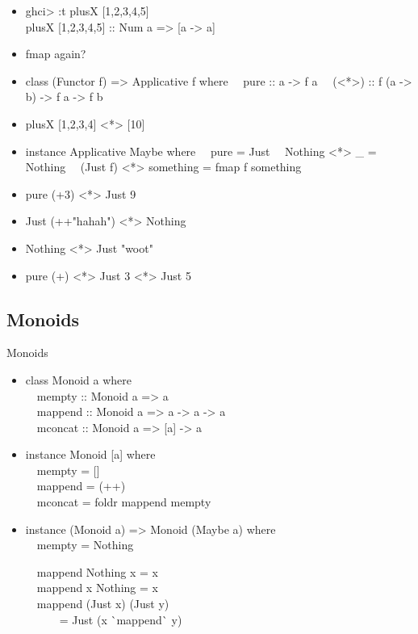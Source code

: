 \documentclass{beamer}                  %
\newcommand{\srule}{
	\rule{\textwidth}{1pt}\\
}
\newlength{\subsecwidth}
\newenvironment{slide}{
	\begin{frame} %
	\settowidth{\subsecwidth}{\insertsubsection} %
	\ifthenelse{\dimtest{\subsecwidth}{<}{1pt}}{ %
		\frametitle{\insertsection\\             %
		\vspace{-1ex}                            %
		\color{fore}\srule                       %
		\par                                     %
		\vspace{-3ex}                            %
		}
	}{                                           %
		\frametitle{\insertsection\ -- \insertsubsection\\ %
		\vspace{-1ex}                            %
		\color{fore}\srule                       %
		\par                                     %
		\vspace{-3ex}                            %
		}
	}
	\Large                                       %
}{
	\end{frame}
}
\begin{document}
\begin{slide}
  \begin{itemize}
    \item ghci> :t plusX [1,2,3,4,5]\\
      plusX [1,2,3,4,5] :: Num a => [a -> a]
    \item fmap again?
    \item
      class (Functor f) => Applicative f where
      ~~pure :: a -> f a
      ~~(<*>) :: f (a -> b) -> f a -> f b
    \item
      plusX [1,2,3,4] <*> [10]
  \end{itemize}
\end{slide}

\begin{slide}
  \begin{itemize}
    \item
      instance Applicative Maybe where
      ~~pure = Just
      ~~Nothing <*> \_ = Nothing
      ~~(Just f) <*> something = fmap f something
    \item pure (+3) <*> Just 9
    \item Just (++"hahah") <*> Nothing
    \item Nothing <*> Just "woot"
    \item pure (+) <*> Just 3 <*> Just 5
  \end{itemize}
\end{slide}

\subsection{Monoids}

\begin{slide}
  Monoids
  \begin{itemize}
    \item
      class Monoid a where\\
      ~~mempty :: Monoid a => a\\
      ~~mappend :: Monoid a => a -> a -> a\\
      ~~mconcat :: Monoid a => [a] -> a
    \item
      instance Monoid [a] where\\
      ~~mempty = []\\
      ~~mappend = (++)\\
      ~~mconcat = foldr mappend mempty
  \end{itemize}
\end{slide}

\begin{slide}
  \begin{itemize}
    \item
      instance (Monoid a) => Monoid (Maybe a) where\\
      ~~mempty = Nothing

      ~~mappend Nothing x = x\\
      ~~mappend x Nothing = x\\
      ~~mappend (Just x) (Just y)\\
      ~~~~~~= Just (x \`{}mappend\`{} y)
  \end{itemize}
\end{slide}
\end{document}
